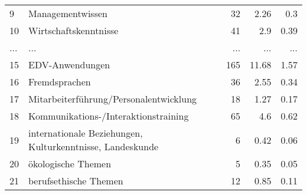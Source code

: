 \begin{longtable}{lXrrr}
        9 & \multicolumn{1}{X}{Managementwissen} & %
          \num{32} &
          \num[round-mode=places,round-precision=2]{2.26} &
          \num[round-mode=places,round-precision=2]{0.3} \\
        10 & \multicolumn{1}{X}{Wirtschaftskenntnisse} & %
          \num{41} &
          \num[round-mode=places,round-precision=2]{2.9} &
          \num[round-mode=places,round-precision=2]{0.39} \\
       ... & ... & ... & ... & ... \\
        15 & \multicolumn{1}{X}{EDV-Anwendungen} & %
          \num{165} &
          \num[round-mode=places,round-precision=2]{11.68} &
          \num[round-mode=places,round-precision=2]{1.57} \\

        16 & \multicolumn{1}{X}{Fremdsprachen} & %
          \num{36} &
          \num[round-mode=places,round-precision=2]{2.55} &
          \num[round-mode=places,round-precision=2]{0.34} \\

        17 & \multicolumn{1}{X}{Mitarbeiterführung/Personalentwicklung} & %
          \num{18} &
          \num[round-mode=places,round-precision=2]{1.27} &
          \num[round-mode=places,round-precision=2]{0.17} \\

        18 & \multicolumn{1}{X}{Kommunikations-/Interaktionstraining} & %
          \num{65} &
          \num[round-mode=places,round-precision=2]{4.6} &
          \num[round-mode=places,round-precision=2]{0.62} \\

        19 & \multicolumn{1}{X}{internationale Beziehungen, Kulturkenntnisse, Landeskunde} & %
          \num{6} &
          \num[round-mode=places,round-precision=2]{0.42} &
          \num[round-mode=places,round-precision=2]{0.06} \\

        20 & \multicolumn{1}{X}{ökologische Themen} & %
          \num{5} &
          \num[round-mode=places,round-precision=2]{0.35} &
          \num[round-mode=places,round-precision=2]{0.05} \\

        21 & \multicolumn{1}{X}{berufsethische Themen} & %
          \num{12} &
          \num[round-mode=places,round-precision=2]{0.85} &
          \num[round-mode=places,round-precision=2]{0.11} \\


\end{longtable}
